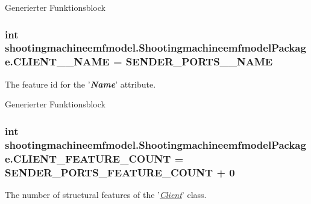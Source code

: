 Generierter Funktionsblock  \hypertarget{interfaceshootingmachineemfmodel_1_1_shootingmachineemfmodel_package_a327d2d5d0a52b9b329eeca590d3a2b15}{
\subsubsection[{C\-L\-I\-E\-N\-T\-\_\-\-\_\-\-N\-A\-M\-E}]{\setlength{\rightskip}{0pt plus 5cm}int shootingmachineemfmodel.\-Shootingmachineemfmodel\-Package.\-C\-L\-I\-E\-N\-T\-\_\-\-\_\-\-N\-A\-M\-E = {\bf S\-E\-N\-D\-E\-R\-\_\-\-P\-O\-R\-T\-S\-\_\-\-\_\-\-N\-A\-M\-E}}}\label{interfaceshootingmachineemfmodel_1_1_shootingmachineemfmodel_package_a327d2d5d0a52b9b329eeca590d3a2b15}
The feature id for the '{\itshape {\bfseries Name}}' attribute.

Generierter Funktionsblock  \hypertarget{interfaceshootingmachineemfmodel_1_1_shootingmachineemfmodel_package_a88a105d8acaabeff58394a5218719930}{
\subsubsection[{C\-L\-I\-E\-N\-T\-\_\-\-F\-E\-A\-T\-U\-R\-E\-\_\-\-C\-O\-U\-N\-T}]{\setlength{\rightskip}{0pt plus 5cm}int shootingmachineemfmodel.\-Shootingmachineemfmodel\-Package.\-C\-L\-I\-E\-N\-T\-\_\-\-F\-E\-A\-T\-U\-R\-E\-\_\-\-C\-O\-U\-N\-T = {\bf S\-E\-N\-D\-E\-R\-\_\-\-P\-O\-R\-T\-S\-\_\-\-F\-E\-A\-T\-U\-R\-E\-\_\-\-C\-O\-U\-N\-T} + 0}}\label{interfaceshootingmachineemfmodel_1_1_shootingmachineemfmodel_package_a88a105d8acaabeff58394a5218719930}
The number of structural features of the '{\itshape \hyperlink{interfaceshootingmachineemfmodel_1_1_client}{Client}}' class.

